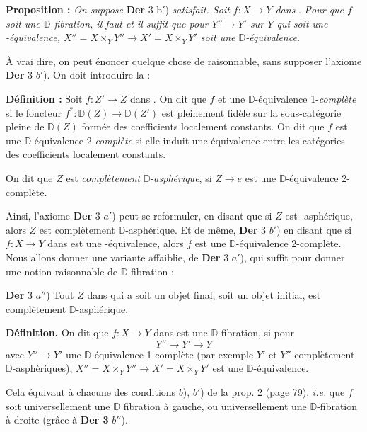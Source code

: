 \documentclass[11pt,leqno]{article}
\newcommand{\printedpage}[1]{\marginpar{\footnotesize p.~#1}}
\newcommand{\msp}[1]{\marginpar{\footnotesize [#1]}}
\newcommand{\DD}{\mathbb{D}}
\newcommand{\Dia}{\mathsf{Dia}}
\newcommand{\Hot}{\mathsf{Hot}}
\begin{document}
\textbf{Proposition :} \textit{On suppose} \textbf{Der} 3 \textup{b}$'$) \textit{satisfait. Soit $f : X \to Y$ dans} \Dia. \textit{Pour que $f$ soit une $\DD$-fibration, il faut et il suffit que pour $Y'' \to Y'$ sur $Y$ qui soit une} \Hot\textit{-équivalence, $X'' = X \times_Y Y'' \to X' = X \times_Y Y'$ soit une $\DD$-équivalence.}

À vrai dire, on peut énoncer quelque chose de raisonnable, sans supposer l’axiome \textbf{Der} 3 $b'$). On doit introduire la :

\textbf{Définition :} Soit $f : Z' \to Z$ dans \Dia. On dit que $f$ et une $\DD$-équivalence 1-\textit{complète} si le foncteur $f^* : \DD(Z) \to \DD(Z')$ est pleinement fidèle sur la sous-catégorie pleine de $\DD(Z)$ formée des coefficients localement constants. On dit que $f$ est une $\DD$-équivalence 2-\textit{complète} si elle induit une équivalence entre les catégories des coefficients localement constants. %

\msp{page 100}
On dit que $Z$ est \textit{complètement} $\DD$-\textit{asphérique}, si $Z \to e$ est une $\DD$-équivalence 2-complète.

\printedpage{61}

Ainsi, l’axiome \textbf{Der} 3 $a'$) peut se reformuler, en disant que si $Z$ est \Hot-asphérique, alors $Z$ est complètement $\DD$-asphérique. Et de même, \textbf{Der} 3 $b'$) en disant que si $f : X \to Y$ dans \Dia{} est une \Hot-équivalence, alors $f$ est une $\DD$-équivalence 2-complète. Nous allons donner une variante affaiblie, de \textbf{Der} 3 $a'$), qui suffit pour donner une notion raisonnable de $\DD$-fibration :

\textbf{Der} 3 $a''$) Tout $Z$ dans \Dia{} qui a soit un objet final, soit un objet initial, est complètement $\DD$-asphérique.

\textbf{Définition.} On dit que $f : X \to Y$ dans \Dia{} est une $\DD$-fibration, si pour
\[
Y'' \longrightarrow Y' \longrightarrow Y
\]
avec $Y'' \to Y'$ une $\DD$-équivalence 1-complète (par exemple $Y'$ et $Y''$ complètement $\DD$-asphèriques), $X'' = X \times_Y Y'' \longrightarrow X' = X \times_Y Y'$ est une $\DD$-équivalence. %

Cela équivaut à chacune des conditions $b$), $b'$) de la prop. 2 (page 79), \textit{i.e.} que $f$ soit universellement une $\DD$ fibration à gauche, ou universellement une $\DD$-fibration à droite (grâce à \textbf{Der 3} $b''$). %
\end{document}
